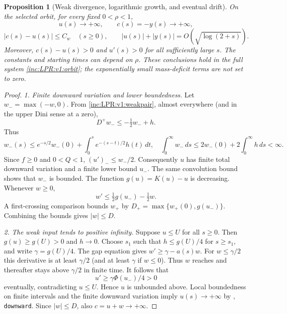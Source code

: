 \documentclass[11pt]{article}
\numberwithin{equation}{section}
\newtheorem{proposition}[theorem]{Proposition}
\theoremstyle{remark}\newtheorem{remark}[theorem]{Remark}
\newcommand{\dd}{\,d}
\begin{document}
\begin{proposition}[Weak divergence, logarithmic growth, and eventual drift]
\label{inc:LPR:v1:weakgrowththeorem}
On the selected orbit, for every fixed $0<\rho<1$,
\[
 u(s)\longrightarrow+\infty,\qquad c(s)=-y(s)\longrightarrow+\infty,
\]
\[
 |c(s)-u(s)|\le C_w\quad(s\ge0),\qquad
 |u(s)|+|y(s)|=O(\sqrt{\log(2+s)}).
\]
Moreover, $c(s)-u(s)>0$ and $u'(s)>0$ for all sufficiently large $s$.
The constants and starting times can depend on $\rho$. These conclusions
hold in the full system \eqref{inc:LPR:v1:orbit}; the exponentially small
mass-deficit terms are not set to zero.
\end{proposition}
\begin{proof}
\emph{1. Finite downward variation and lower boundedness.}
Let $w_-=\max(-w,0)$. From \eqref{inc:LPR:v1:weakpair}, almost everywhere
(and in the upper Dini sense at a zero),
\[
 D^+w_-\le-\tfrac12w_-+h.
\]
Thus
\[
 w_-(s)\le e^{-s/2}w_-(0)+\int_0^s e^{-(s-t)/2}h(t)\dd t,
 \quad
 \int_0^\infty w_-\dd s\le2w_-(0)+2\int_0^\infty h\dd s<\infty.
\]
Since $f\ge0$ and $0<Q<1$, $(u')_-\le w_-/2$. Consequently $u$ has
finite total downward variation and a finite lower bound $u_-$.
The same convolution bound shows that $w_-$ is bounded. The function
$g(u)=K(u)-u$ is decreasing. Whenever $w\ge0$,
\[
 w'\le\tfrac12g(u_-)-\tfrac12w.
\]
A first-crossing comparison bounds $w_+$ by
$D_+=\max\{w_+(0),g(u_-)\}$. Combining the bounds gives $|w|\le D$.

\emph{2. The weak input tends to positive infinity.}
Suppose $u\le U$ for all $s\ge0$. Then $g(u)\ge g(U)>0$ and $h\to0$.
Choose $s_1$ such that $h\le g(U)/4$ for $s\ge s_1$, and write
$\gamma=g(U)/4$. The gap equation gives
$w'\ge\gamma-a(s)w$. For $w\le\gamma/2$ this derivative is at least
$\gamma/2$ (and at least $\gamma$ if $w\le0$). Thus $w$ reaches and
thereafter stays above $\gamma/2$ in finite time. It follows that
\[
 u'\ge\gamma\Phi(u_-)/4>0
\]
eventually, contradicting $u\le U$. Hence $u$ is unbounded above. Local
boundedness on finite intervals and the finite downward variation imply
$u(s)\to+\infty$ by \cite{LP}, \texttt{downward}. Since $|w|\le D$, also
$c=u+w\to+\infty$.


\end{proof}
\end{document}
